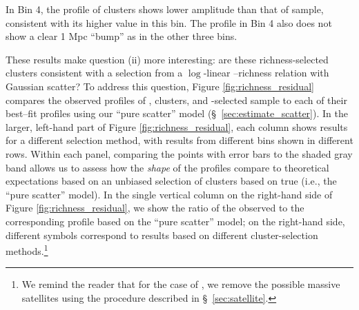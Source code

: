 \documentclass[fleqn,usenatbib,useAMS]{mnras}
\begin{document}
\begin{CJK*}{UTF8}{gbsn}
    In Bin 4, the \dsigma{} profile of \redm{} clusters shows lower amplitude than that of 
     sample, consistent with its higher \sigmvir{} value in this bin. 
    The \dsigma{} profile in Bin 4 also does not show a clear 1 Mpc ``bump'' as in the other three
    bins.
    
    These results make question (ii) more interesting: are these richness-selected clusters
    consistent with a selection from a $\log$-linear \mvir{}--richness relation with Gaussian
    scatter? 
    To address this question, Figure \ref{fig:richness_residual} compares the observed \dsigma{}
    profiles of \redm{}, \camira{} clusters, and -selected sample to each of their
    best--fit profiles using our ``pure scatter'' model (\S\ \ref{sec:estimate_scatter}). 
    In the larger, left-hand part of Figure \ref{fig:richness_residual}, each column shows results
    for a different \topn{} selection method, with results from different bins shown in different
    rows. 
    Within each panel, comparing the points with error bars to the shaded gray band allows us to 
    assess how the {\em shape} of the \dsigma{} profiles compare to theoretical expectations based
    on an unbiased selection of clusters based on true \mvir{} (i.e., the ``pure scatter'' model).
    In the single vertical column on the right-hand side of Figure \ref{fig:richness_residual}, we
    show the ratio of the observed \dsigma{} to the corresponding profile based on the ``pure
    scatter'' model; on the right-hand side, different symbols correspond to results based on
    different cluster-selection methods.\footnote{We remind the reader that for the case of
    , we remove the possible massive satellites using the procedure described in \S\
    \ref{sec:satellite}.}    


\end{CJK*}
\end{document}
